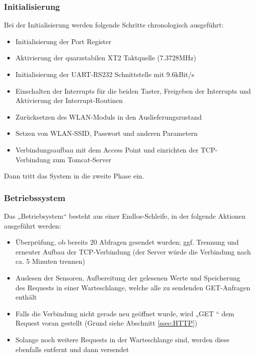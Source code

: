 \documentclass[12pt,a4paper,twoside]{article}
\begin{document}
\subsubsection{Initialisierung}
Bei der Initialisierung werden folgende Schritte chronologisch ausgeführt: 

\begin{itemize}
 \item Initialisierung der Port Register
 \item Aktivierung der quarzstabilen XT2 Taktquelle (7.3728MHz)
 \item Initialisierung der UART-RS232 Schnittstelle mit 9.6kBit/s
 \item Einschalten der Interrupts für die beiden Taster, Freigeben der Interrupts und  Aktivierung der Interrupt-Routinen
 \item Zurücksetzen des WLAN-Moduls in den Auslieferungszustand
 \item Setzen von WLAN-SSID, Passwort und anderen Parametern
 \item Verbindungsaufbau mit dem Access Point und einrichten der TCP-Verbindung zum Tomcat-Server
\end{itemize}
Dann tritt das System in die zweite Phase ein.

\subsubsection{Betriebssystem}

Das „Betriebsystem“ besteht aus einer Endlos-Schleife, in der folgende Aktionen ausgeführt werden:
\begin{itemize}
 \item Überprüfung, ob bereits 20 Abfragen gesendet wurden; ggf. Trennung und erneuter Aufbau der TCP-Verbindung (der Server würde die Verbindung nach ca. 5 Minuten trennen)
 \item Auslesen der Sensoren, Aufbereitung der gelesenen Werte und Speicherung des Requests in einer Warteschlange, welche alle zu sendenden GET-Anfragen enthält
 \item Falls die Verbindung nicht gerade neu geöffnet wurde, wird „GET “ dem Request voran gestellt (Grund siehe Abschnitt \ref{ssec:HTTP})
 \item Solange noch weitere Requests in der Warteschlange sind, werden diese ebenfalls entfernt und dann versendet
\end{itemize}
\end{document}
